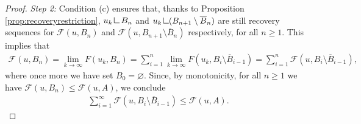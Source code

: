 \documentclass[a4paper,11pt]{article}
\numberwithin{equation}{section}
\newcommand{\res}      {\mathop{\hbox{\vrule height 7pt width .5pt depth
                        0pt\vrule height .5pt width 6pt depth 0pt}}\nolimits}
\begin{document}
\begin{proof}
\textit{Step 2:}	Condition (c) ensures that, thanks to Proposition \ref{prop:recoveryrestriction}, $u_k\res B_n$ and $u_k\res (B_{n+1}\setminus \overline B_n)$ are still recovery sequences for $\mathcal F(u,B_n)$ and $\mathcal F(u,B_{n+1}\setminus \overline B_n) $ respectively, for all $n\geq1$. This implies that
\begin{align*}
\mathcal F(u,B_n)=\lim_{k\rightarrow \infty}F(u_k,B_n)=\sum_{i=1}^n\lim_{k\rightarrow \infty}F(u_k,B_i\setminus\overline B_{i-1})=\sum_{i=1}^n\mathcal F(u,B_i\setminus\overline B_{i-1}),
\end{align*}	
	where once more we have set $B_0=\varnothing$.
	Since, by monotonicity, for all $n\geq 1$ we have $\mathcal F(u,B_n)\leq \mathcal F(u,A)$, we conclude
	\begin{align}\label{311}
\sum_{i=1}^\infty 	\mathcal F(u,B_i\setminus \overline B_{i-1})\leq\mathcal F(u,A). 
	\end{align}
%
%	

\end{proof}
\end{document}
